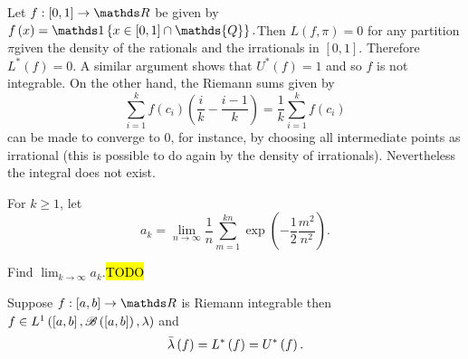 \begin{example}
\label{exa:nonRiemannIntegrableFunction}Let $f:\left[0,1\right]\to\R$
be given by $f\left(x\right)=\indicate\left\{ x\in\left[0,1\right]\cap\mathds{Q}\right\} .$Then
$L\left(f,\pi\right)=0$ for any partition $\pi$given the density
of the rationals and the irrationals in $\left[0,1\right].$ Therefore
$L^{*}\left(f\right)=0.$ A similar argument shows that $U^{*}\left(f\right)=1$
and so $f$ is not integrable. On the other hand, the Riemann sums
given by 
\[
\sum_{i=1}^{k}f\left(c_{i}\right)\left(\frac{i}{k}-\frac{i-1}{k}\right)=\frac{1}{k}\sum_{i=1}^{k}f\left(c_{i}\right)
\]
can be made to converge to 0, for instance, by choosing all intermediate
points as irrational (this is possible to do again by the density
of irrationals). Nevertheless the integral does not exist.
\end{example}

\begin{example}
\label{exa:isi2008samplepsb2} For $k\geq1$, let 
\[
a_{k}=\lim_{n\rightarrow\infty}\frac{1}{n}\sum_{m=1}^{kn}\exp\left(-\frac{1}{2}\frac{m^{2}}{n^{2}}\right).
\]

Find $\lim_{k\rightarrow\infty}a_{k}$.\hl{TODO}
\end{example}

\begin{thm}
\label{thm:lebesgueRiemannEqual}Suppose $f:\left[a,b\right]\to\R$
is Riemann integrable then $f\in L^{1}\left(\left[a,b\right],\mathscr{B}\left(\left[a,b\right]\right),\lambda\right)$
and 
\[
\bar{\lambda}\left(f\right)=L^{*}\left(f\right)=U^{*}\left(f\right).
\]
\end{thm}

